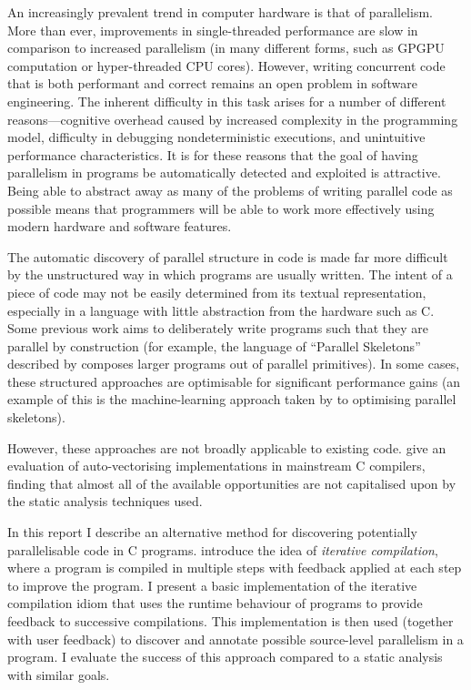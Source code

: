 \documentclass[journal]{IEEEtran}
\begin{document}
An increasingly prevalent trend in computer hardware is that of parallelism.
More than ever, improvements in single-threaded performance are slow in
comparison to increased parallelism (in many different forms, such as GPGPU
computation or hyper-threaded CPU cores). However, writing concurrent code that
is both performant and correct remains an open problem in software engineering.
The inherent difficulty in this task arises for a number of different
reasons---cognitive overhead caused by increased complexity in the programming
model, difficulty in debugging nondeterministic executions, and unintuitive
performance characteristics. It is for these reasons that the goal of having
parallelism in programs be automatically detected and exploited is attractive.
Being able to abstract away as many of the problems of writing parallel code as
possible means that programmers will be able to work more effectively using
modern hardware and software features.

The automatic discovery of parallel structure in code is made far more difficult
by the unstructured way in which programs are usually written.  The intent of a
piece of code may not be easily determined from its textual representation,
especially in a language with little abstraction from the hardware such as C.
Some previous work aims to deliberately write programs such that they are
parallel by construction (for example, the language of ``Parallel Skeletons''
described by \textcite{gorlatch_parallel_2011} composes larger programs out of
parallel primitives). In some cases, these structured approaches are optimisable
for significant performance gains (an example of this is the machine-learning
approach taken by \textcite{collins_masif:_2013} to optimising parallel
skeletons).

However, these approaches are not broadly applicable to existing code.
\textcite{maleki_evaluation_2011} give an evaluation of auto-vectorising
implementations in mainstream C compilers, finding that almost all of the
available opportunities are not capitalised upon by the static analysis
techniques used.

In this report I describe an alternative method for discovering potentially
parallelisable code in C programs. \textcite{fursin_evaluating_2002} introduce
the idea of \emph{iterative compilation}, where a program is compiled in
multiple steps with feedback applied at each step to improve the program. I
present a basic implementation of the iterative compilation idiom that uses the
runtime behaviour of programs to provide feedback to successive compilations.
This implementation is then used (together with user feedback) to discover and
annotate possible source-level parallelism in a program. I evaluate the success
of this approach compared to a static analysis with similar goals.
\end{document}
